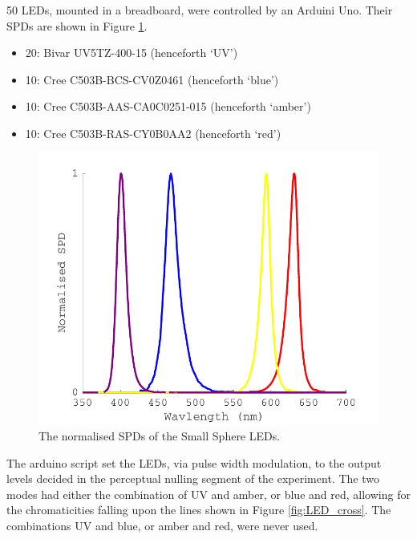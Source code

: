 50 LEDs, mounted in a breadboard, were controlled by an Arduini Uno. Their \glspl{SPD} are shown in Figure \ref{fig:LED_SPDs}. %

\begin{itemize}
    \item 20: Bivar UV5TZ-400-15 (henceforth `UV')
    \item 10: Cree C503B-BCS-CV0Z0461 (henceforth `blue')
    \item 10: Cree C503B-AAS-CA0C0251-015 (henceforth `amber')
    \item 10: Cree C503B-RAS-CY0B0AA2 (henceforth `red')
\end{itemize}


\begin{figure}[htbp]
\includegraphics[max width=\textwidth,center]{figs/SmallSphere/LED_SPDs.pdf}
\caption{The normalised \glspl{SPD} of the Small Sphere \glspl{LED}.}
\label{fig:LED_SPDs}
\end{figure}

The arduino script set the \glspl{LED}, via pulse width modulation, to the output levels decided in the perceptual nulling segment of the experiment. The two modes had either the combination of UV and amber, or blue and red, allowing for the chromaticities falling upon the lines shown in Figure \ref{fig:LED_cross}. The combinations UV and blue, or amber and red, were never used.

